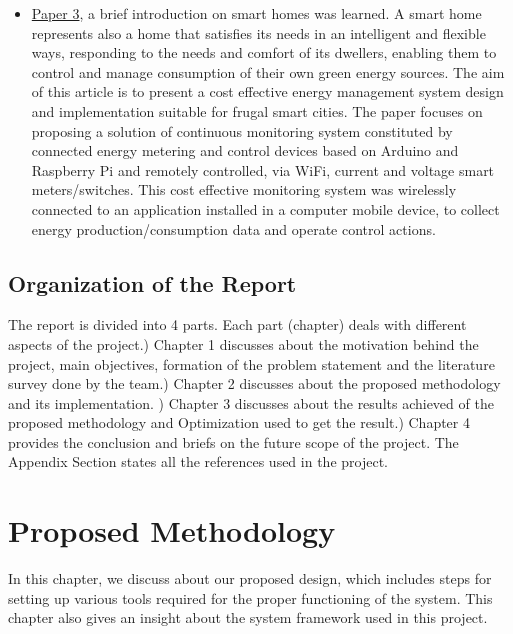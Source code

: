 \documentclass[12 pt]{report}
\begin{document}
  \begin{itemize}
\item \underline{Paper 3}, a brief introduction on smart homes was learned. A smart home represents also a home that satisfies its needs in an intelligent and flexible ways, responding to the needs and comfort of its dwellers, enabling them to control and manage consumption of their own green energy sources. The aim of this article is to present a cost effective energy management system design and implementation suitable for frugal smart cities. The paper focuses on proposing a solution of continuous monitoring system constituted by connected energy metering and control devices based on Arduino and Raspberry Pi and remotely controlled, via WiFi, current and voltage smart meters/switches. This cost effective monitoring system was wirelessly connected to an application installed in a computer mobile device, to collect energy production/consumption data and operate control actions.
\end{itemize}

\section{Organization of the Report}
The report is divided into 4 parts. Each part (chapter) deals with different aspects of the project.) Chapter 1 discusses about the motivation behind the project, main objectives, formation of the problem statement and the literature survey done by the team.) Chapter 2 discusses about the proposed methodology and its implementation.
) Chapter 3 discusses about the results achieved of the proposed methodology and Optimization used to get the result.) Chapter 4 provides the conclusion and briefs on the future scope of the project.\newline
The Appendix Section states all the references used in the project.


\newpage
\chapter{Proposed Methodology}
 In this chapter, we discuss about our proposed design, which includes steps for setting up various tools required for the proper functioning of the system. This chapter also gives an insight about the system framework used in this project.
 
\end{document}
